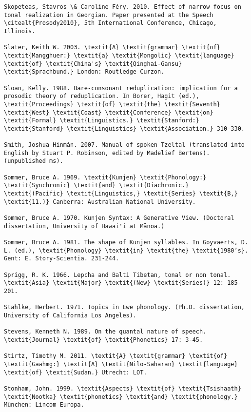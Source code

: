 \begin{verbatim}
Skopeteas, Stavros \& Caroline Féry. 2010. Effect of narrow focus on tonal realization in Georgian. Paper presented at the Speech \citealt{Prosody2010}, 5th International Conference, Chicago, Illinois.

Slater, Keith W. 2003. \textit{A} \textit{grammar} \textit{of} \textit{Mangghuer:} \textit{a} \textit{Mongolic} \textit{language} \textit{of} \textit{China's} \textit{Qinghai-Gansu} \textit{Sprachbund.} London: Routledge Curzon.

Sloan, Kelly. 1988. Bare-consonant reduplication: implication for a prosodic theory of reduplication. In Borer, Hagit (ed.), \textit{Proceedings} \textit{of} \textit{the} \textit{Seventh} \textit{West} \textit{Coast} \textit{Conference} \textit{on} \textit{Formal} \textit{Linguistics.} \textit{Stanford:} \textit{Stanford} \textit{Linguistics} \textit{Association.} 310-330.

Smith, Joshua Hinmán. 2007. Manual of spoken Tzeltal (translated into English by Stuart P. Robinson, edited by Madelief Bertens). (unpublished ms).

Sommer, Bruce A. 1969. \textit{Kunjen} \textit{Phonology:} \textit{Synchronic} \textit{and} \textit{Diachronic.} \textit{(Pacific} \textit{Linguistics,} \textit{Series} \textit{B,} \textit{11.)} Canberra: Australian National University.

Sommer, Bruce A. 1970. Kunjen Syntax: A Generative View. (Doctoral dissertation, University of Hawai'i at Mānoa.)

Sommer, Bruce A. 1981. The shape of Kunjen syllables. In Goyvaerts, D. L. (ed.), \textit{Phonology} \textit{in} \textit{the} \textit{1980’s}. Gent: E. Story-Scientia. 231-244.

Sprigg, R. K. 1966. Lepcha and Balti Tibetan, tonal or non tonal. \textit{Asia} \textit{Major} \textit{(New} \textit{Series)} 12: 185-201.

Stahlke, Herbert. 1971. Topics in Ewe phonology. (Ph.D. dissertation, University of California Los Angeles).

Stevens, Kenneth N. 1989. On the quantal nature of speech. \textit{Journal} \textit{of} \textit{Phonetics} 17: 3-45.

Stirtz, Timothy M. 2011. \textit{A} \textit{grammar} \textit{of} \textit{Gaahmg:} \textit{A} \textit{Nilo-Saharan} \textit{language} \textit{of} \textit{Sudan.} Utrecht: LOT.

Stonham, John. 1999. \textit{Aspects} \textit{of} \textit{Tsishaath} \textit{Nootka} \textit{phonetics} \textit{and} \textit{phonology.} München: Lincom Europa.


\end{verbatim}
